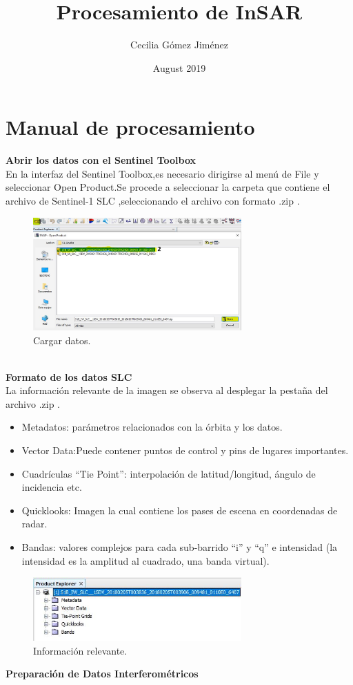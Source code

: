 \documentclass{article}
\title{Procesamiento de InSAR}
\author{Cecilia Gómez Jiménez}
\date{August 2019}
\begin{document}
\maketitle

\section{Manual de procesamiento}
\textbf{Abrir los datos con el Sentinel Toolbox}\\

En la interfaz del Sentinel Toolbox,es necesario dirigirse al menú de File y seleccionar Open Product.Se procede a seleccionar la carpeta que contiene el archivo de Sentinel-1 SLC ,seleccionando el archivo con formato .zip .\\
    \begin{figure}[htbp]
    \centering
    \includegraphics[width=8cm]{Imagen/02.JPG}
    \caption{Cargar datos.}
    \label{fig:01}
    \end{figure}\\
\textbf{Formato de los datos SLC}\\
La información relevante de la imagen se observa al desplegar la pestaña del archivo .zip .

\begin{itemize}
    \item Metadatos: parámetros relacionados con la órbita y los datos.
    \item Vector Data:Puede contener puntos de control y pins de lugares importantes.
    \item Cuadrículas “Tie Point”: interpolación de latitud/longitud, ángulo de incidencia etc.
    \item Quicklooks: Imagen la cual contiene los pases de escena en coordenadas de radar.
    \item Bandas: valores complejos para cada sub-barrido “i” y “q” e intensidad (la intensidad es la amplitud al cuadrado, una banda virtual).
\end{itemize}
    \begin{figure}[htbp]
    \centering
    \includegraphics[width=8cm]{Imagen/01.JPG}
    \caption{Información relevante.}
    \label{fig:02}
    \end{figure}
\textbf{Preparación de Datos Interferométricos}\\
\end{document}
